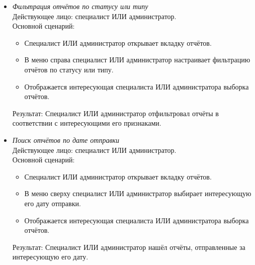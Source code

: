 \begin{itemize}[topsep=0pt, parsep=0pt, itemsep=0pt, leftmargin=*, labelindent=0.5cm]
	\item \textit{Фильтрация отчётов по статусу или типу} \\
	Действующее лицо: специалист ИЛИ администратор. \\
	Основной сценарий:
	\begin{itemize}[topsep=0pt, parsep=0pt, itemsep=0pt, leftmargin=*, labelindent=0.5cm]
		\item Специалист ИЛИ администратор открывает вкладку отчётов.
		\item В меню справа специалист ИЛИ администратор настраивает фильтрацию отчётов по статусу или типу.
		\item Отображается интересующая специалиста ИЛИ администратора выборка отчётов.
	\end{itemize}
	Результат: Специалист ИЛИ администратор отфильтровал отчёты в соответствии с интересующими его признаками.
\end{itemize}

\begin{itemize}[topsep=0pt, parsep=0pt, itemsep=0pt, leftmargin=*, labelindent=0.5cm]
	\item \textit{Поиск отчётов по дате отправки} \\
	Действующее лицо: специалист ИЛИ администратор. \\
	Основной сценарий:
	\begin{itemize}[topsep=0pt, parsep=0pt, itemsep=0pt, leftmargin=*, labelindent=0.5cm]
		\item Специалист ИЛИ администратор открывает вкладку отчётов.
		\item В меню сверху специалист ИЛИ администратор выбирает интересующую его дату отправки.
		\item Отображается интересующая специалиста ИЛИ администратора выборка отчётов.
	\end{itemize}
	Результат: Специалист ИЛИ администратор нашёл отчёты, отправленные за интересующую его дату.
\end{itemize}

